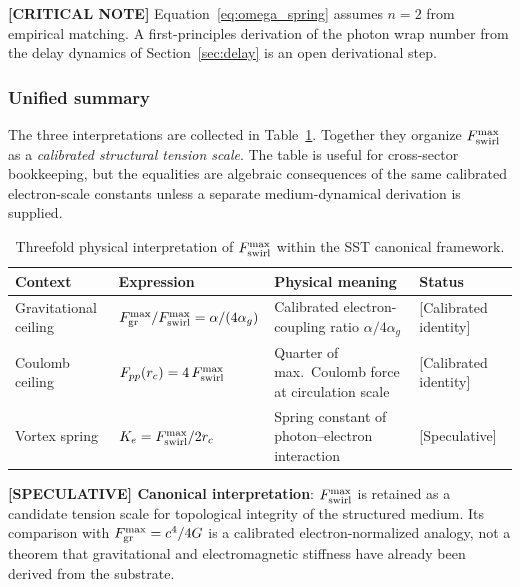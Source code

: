 \documentclass[11pt]{article}
\theoremstyle{definition}
\theoremstyle{plain}
\theoremstyle{remark}
\newcommand{\rc}{{r_c}}
\begin{document}
        \textbf{[CRITICAL NOTE]} Equation~\eqref{eq:omega_spring} assumes $n=2$ from empirical matching. A first-principles derivation of the photon wrap number from the delay dynamics of Section~\ref{sec:delay} is an open derivational step.

        \subsubsection{Unified summary}

        The three interpretations are collected in Table~\ref{tab:Fmax_triple}. Together they organize $F_{\rm swirl}^{\max}$ as a \emph{calibrated structural tension scale}. The table is useful for cross-sector bookkeeping, but the equalities are algebraic consequences of the same calibrated electron-scale constants unless a separate medium-dynamical derivation is supplied.

        \begin{table}[h]
        \centering
        \caption{Threefold physical interpretation of $F_{\rm swirl}^{\max}$ within the SST canonical framework.}
        \label{tab:Fmax_triple}
        \begin{tabular}{p{3.2cm}p{5.0cm}p{4.8cm}l}
        \hline
        \textbf{Context} & \textbf{Expression} & \textbf{Physical meaning} & \textbf{Status} \\
        \hline
        Gravitational ceiling &
          $F_{\rm gr}^{\max}/F_{\rm swirl}^{\max} = \alpha/(4\alpha_g)$ &
          Calibrated electron-coupling ratio $\alpha/4\alpha_g$ &
          {[Calibrated identity]} \\[6pt]
        Coulomb ceiling &
          $F_{pp}(\rc) = 4\,F_{\rm swirl}^{\max}$ &
          Quarter of max.\ Coulomb force at circulation scale &
          {[Calibrated identity]} \\[6pt]
        Vortex spring &
          $K_e = F_{\rm swirl}^{\max}/2\rc$ &
          Spring constant of photon--electron interaction &
          {[Speculative]} \\
        \hline
        \end{tabular}
        \end{table}

        \textbf{[SPECULATIVE] Canonical interpretation}: $F_{\rm swirl}^{\max}$ is retained as a candidate tension scale for topological integrity of the structured medium. Its comparison with $F_{\rm gr}^{\max}=c^4/4G$ is a calibrated electron-normalized analogy, not a theorem that gravitational and electromagnetic stiffness have already been derived from the substrate.
\end{document}
